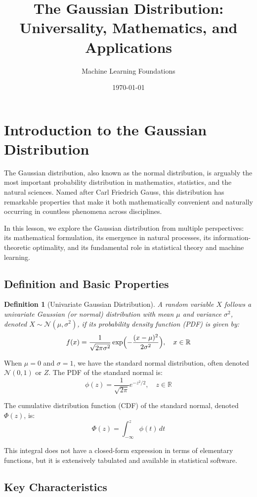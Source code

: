 \documentclass{article}
\title{The Gaussian Distribution: Universality, Mathematics, and Applications}
\author{Machine Learning Foundations}
\date{\today}
\newtheorem{definition}{Definition}
\begin{document}
\maketitle
\tableofcontents

\section{Introduction to the Gaussian Distribution}

The Gaussian distribution, also known as the normal distribution, is arguably the most important probability distribution in mathematics, statistics, and the natural sciences. Named after Carl Friedrich Gauss, this distribution has remarkable properties that make it both mathematically convenient and naturally occurring in countless phenomena across disciplines.

In this lesson, we explore the Gaussian distribution from multiple perspectives: its mathematical formulation, its emergence in natural processes, its information-theoretic optimality, and its fundamental role in statistical theory and machine learning.

\subsection{Definition and Basic Properties}

\begin{definition}[Univariate Gaussian Distribution]
A random variable $X$ follows a univariate Gaussian (or normal) distribution with mean $\mu$ and variance $\sigma^2$, denoted $X \sim \mathcal{N}(\mu, \sigma^2)$, if its probability density function (PDF) is given by:
\[
f(x) = \frac{1}{\sqrt{2\pi\sigma^2}} \exp\Bigl(-\frac{(x-\mu)^2}{2\sigma^2}\Bigr), \quad x \in \mathbb{R}
\]
\end{definition}

When $\mu = 0$ and $\sigma = 1$, we have the standard normal distribution, often denoted $\mathcal{N}(0,1)$ or $Z$. The PDF of the standard normal is:
\[
\phi(z) = \frac{1}{\sqrt{2\pi}} e^{-z^2/2}, \quad z \in \mathbb{R}
\]

The cumulative distribution function (CDF) of the standard normal, denoted $\Phi(z)$, is:
\[
\Phi(z) = \int_{-\infty}^{z} \phi(t) \, dt
\]

This integral does not have a closed-form expression in terms of elementary functions, but it is extensively tabulated and available in statistical software.

\subsection{Key Characteristics}
\end{document}
